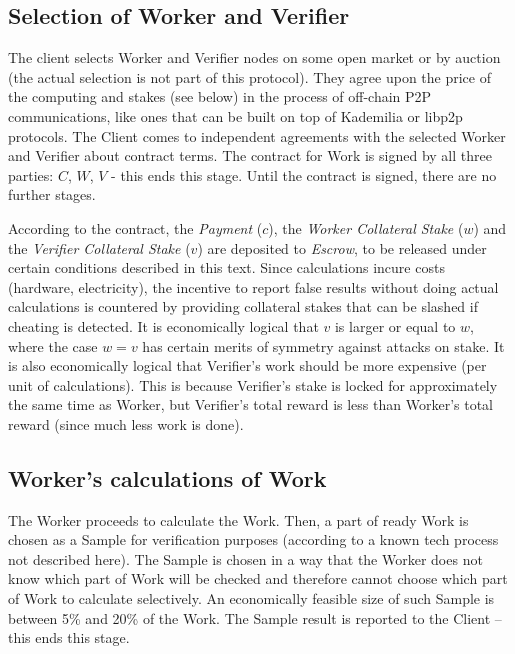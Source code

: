 \documentclass[conference]{IEEEtran}
\begin{document}
\subsection{Selection of Worker and Verifier}
\label{selection}

The client selects Worker and Verifier nodes on some open market or by auction (the actual selection is not part of this protocol). They agree upon the price of the computing and stakes (see below) in the process of off-chain P2P communications, like ones that can be built on top of Kademilia \cite{kademlia} or libp2p \cite{libp2p} protocols. The Client comes to independent agreements with the selected Worker and Verifier about contract terms. The contract for Work is signed by all three parties: $C$, $W$, $V$ - this ends this stage. Until the contract is signed, there are no further stages.

According to the contract, the \textit{Payment} ($c$), the \textit{Worker Collateral Stake} ($w$) and the \textit{Verifier Collateral Stake} ($v$) are deposited to \textit{Escrow}, to be released under certain conditions described in this text. Since calculations incure costs (hardware, electricity), the incentive to report false results without doing actual calculations is countered by providing collateral stakes that can be slashed if cheating is detected. It is economically logical that $v$ is larger or equal to $w$, where the case $w=v$ has certain merits of symmetry against attacks on stake. It is also economically logical that Verifier's work should be more expensive (per unit of calculations). This is because Verifier's stake is locked for approximately the same time as Worker, but Verifier's total reward is less than Worker's total reward (since much less work is done).

\subsection{Worker's calculations of Work}
\label{calculation}

The Worker proceeds to calculate the Work. Then, a part of ready Work is chosen as a Sample for verification purposes (according to a known tech process not described here). The Sample is chosen in a way that the Worker does not know which part of Work will be checked and therefore cannot choose which part of Work to calculate selectively. An economically feasible size of such Sample is between 5\% and 20\% of the Work. The Sample result is reported to the Client – this ends this stage.
\end{document}
